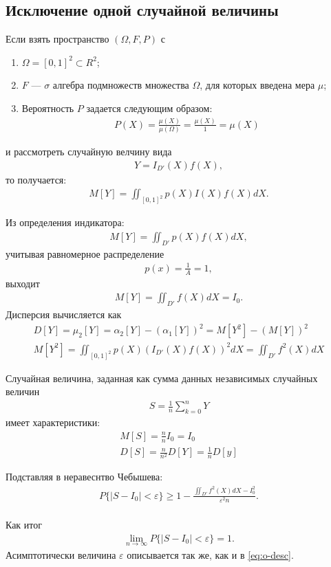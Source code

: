 \subsection{Исключение одной случайной величины}\label{method-2}
Если взять пространство \((\Omega, F, P)\) с
\begin{enumerate}
	\item \(\Omega = [0,1]^2 \subset R^2\);
	\item \(F\) --- \(\sigma\) алгебра подмножеств множества \(\Omega\), для которых введена мера \(\mu\);
	\item Вероятность \(P\) задается следующим образом:
	      \begin{align*}
		      P(X) = \frac{\mu(X)}{\mu(\Omega)} = \frac{\mu(X)}{1} = \mu(X)
	      \end{align*}
\end{enumerate}

и рассмотреть случайную велчину вида
\begin{align}
	Y = I_{D'}(X)f(X),
\end{align}
то получается:
\begin{align}
	M[Y] = \iint_{[0,1]^2} p(X) I(X) f(X) dX.
\end{align}

Из определения индикатора:
\begin{align}
	M[Y] = \iint_{D'} p(X)f(X) dX,
\end{align}
учитывая равномерное распределение
\begin{align}
	p(x) = \frac{1}{A} = 1,
\end{align}
выходит
\begin{align}
	M[Y] = \iint_{D'} f(X) dX = I_0.
\end{align}
Дисперсия вычисляется как
\begin{align}
	D[Y] = \mu_2[Y] = \alpha_2[Y] - (\alpha_1[Y])^2 = M[Y^2] - (M[Y])^2 \\
	M[Y^2] = \iint_{[0, 1]^2} p(X)(I_{D'}(X)f(X))^2 dX = \iint_{D'}f^2(X) dX
\end{align}

Случайная величина, заданная как сумма данных независимых случайных величин
\begin{align}
	S = \frac{1}{n}\sum_{k=0}^n Y
\end{align}
имеет характеристики:
\begin{align}
	M[S] = \frac{n}{n}I_0 = I_0 \\
	D[S] = \frac{n}{n^2} D[Y] = \frac{1}{n} D[y]
\end{align}

Подставляя в неравеснтво Чебышева:
\begin{align}
	P\{|S - I_0|<\varepsilon\} \geq 1 - \frac{\iint_{D'}f^2(X)dX - I_0^2}{\varepsilon^2 n}. \\
\end{align}

Как итог
\begin{align}
	\lim_{n\to\infty}P\{|S - I_0|<\varepsilon\} = 1.
\end{align}
Асимптотически величина \(\varepsilon\) описывается так же, как и в \cref{eq:o-desc}.

